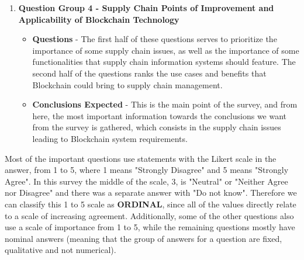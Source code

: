 \begin{enumerate}
\item \textbf{Question Group 4 - Supply Chain Points of Improvement and Applicability of Blockchain Technology} 
	\begin{itemize}
    \item \textbf{Questions} - The first half of these questions serves to prioritize the importance of some supply chain issues, as well as the importance of some functionalities that supply chain information systems should feature. The second half of the questions ranks the use cases and benefits that Blockchain could bring to supply chain management.
    \item \textbf{Conclusions Expected} - This is the main point of the survey, and from here, the most important information towards the conclusions we want from the survey is gathered, which consists in the supply chain issues leading to Blockchain system requirements.
	\end{itemize}
    
\end{enumerate}


\par Most of the important questions use statements with the Likert scale in the answer, from 1 to 5, where 1 means "Strongly Disagree" and 5 means "Strongly Agree". In this survey the middle of the scale, 3, is "Neutral" or "Neither Agree nor Disagree" and there was a separate answer with "Do not know". Therefore we can classify this 1 to 5 scale as \textbf{ORDINAL}, since all of the values directly relate to a scale of increasing agreement. Additionally, some of the other questions also use a scale of importance from 1 to 5, while the remaining questions mostly have nominal answers (meaning that the group of answers for a question are fixed, qualitative and not numerical). 

